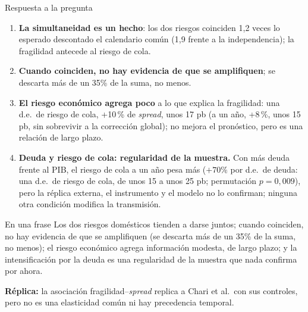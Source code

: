 \documentclass[aspectratio=169]{beamer}
\begin{document}
\begin{frame}{Respuesta a la pregunta}
\footnotesize
\begin{enumerate}\setlength\itemsep{0pt}
\item \textbf{La simultaneidad es un hecho}: los dos riesgos coinciden 1,2 veces lo esperado descontado el calendario común (1,9 frente a la independencia); la fragilidad antecede al riesgo de cola.
\item \textbf{Cuando coinciden, no hay evidencia de que se amplifiquen}; se descarta más de un 35\% de la suma, no menos.
\item \textbf{El riesgo económico agrega poco} a lo que explica la fragilidad: una d.e.\ de riesgo de cola, +10\,\% de \textit{spread}, unos 17 pb (a un año, +8\,\%, unos 15 pb, sin sobrevivir a la corrección global); no mejora el pronóstico, pero es una relación de largo plazo.
\item \textbf{Deuda y riesgo de cola: regularidad de la muestra.} Con más deuda frente al PIB, el riesgo de cola a un año pesa más ($+70\%$ por d.e.\ de deuda: una d.e.\ de riesgo de cola, de unos 15 a unos 25 pb; permutación $p=0{,}009$), pero la réplica externa, el instrumento y el modelo no lo confirman; ninguna otra condición modifica la transmisión.
\end{enumerate}
\vspace{-2pt}
\begin{block}{En una frase}
\scriptsize Los dos riesgos domésticos tienden a darse juntos; cuando coinciden, no hay evidencia de que se amplifiquen (se descarta más de un 35\% de la suma, no menos); el riesgo económico agrega información modesta, de largo plazo; y la intensificación por la deuda es una regularidad de la muestra que nada confirma por ahora.
\end{block}
\vspace{-4pt}
{\scriptsize \textbf{Réplica:} la asociación fragilidad--\textit{spread} replica a Chari et al.\ con sus controles, pero no es una elasticidad común ni hay precedencia temporal.\par}
\end{frame}
\end{document}

